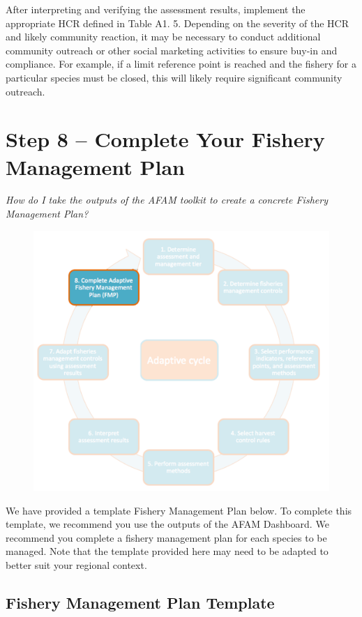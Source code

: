 \documentclass[]{book}
\begin{document}
After interpreting and verifying the assessment results, implement the
appropriate HCR defined in Table A1. 5. Depending on the severity of the
HCR and likely community reaction, it may be necessary to conduct
additional community outreach or other social marketing activities to
ensure buy-in and compliance. For example, if a limit reference point is
reached and the fishery for a particular species must be closed, this
will likely require significant community outreach.

\chapter{Step 8 -- Complete Your Fishery Management Plan}\label{Step8}

\emph{How do I take the outputs of the AFAM toolkit to create a concrete
Fishery Management Plan?}

\begin{figure}
\centering
\includegraphics{myMediaFolder/media/Step8.png}
\caption{}
\end{figure}

We have provided a template Fishery Management Plan below. To complete
this template, we recommend you use the outputs of the AFAM Dashboard.
We recommend you complete a fishery management plan for each species to
be managed. Note that the template provided here may need to be adapted
to better suit your regional context.

\section{Fishery Management Plan
Template}\label{fishery-management-plan-template}
\end{document}
